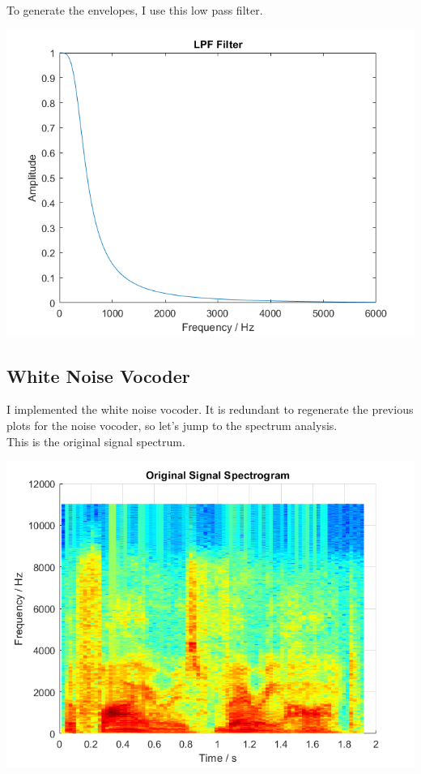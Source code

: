 \documentclass[11pt]{article}
\begin{document}
To generate the envelopes, I use this low pass filter.

\includegraphics[width=\textwidth]{output/envelope_lpf.png}

\subsection{White Noise Vocoder}

I implemented the white noise vocoder.
It is redundant to regenerate the previous plots for
the noise vocoder, so let's jump to the spectrum analysis.\\

This is the original signal spectrum.

\includegraphics[width=\textwidth]{output/original_spectrogram.png}
\end{document}
